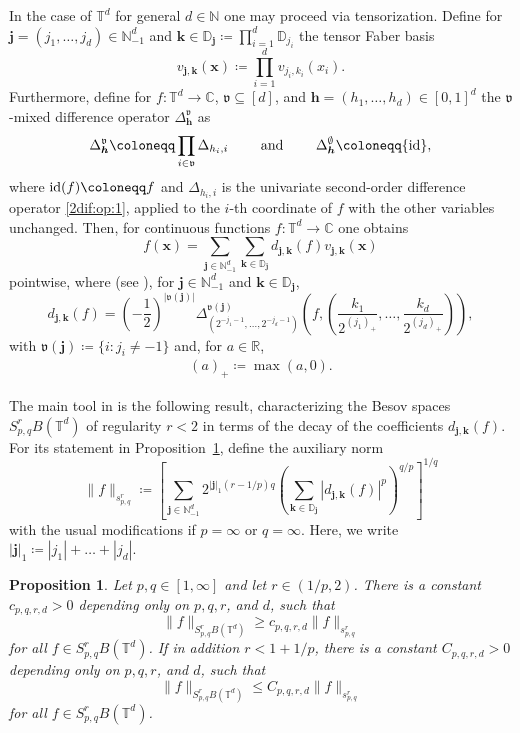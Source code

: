 \documentclass[12pt, a4paper]{article}
\newtheorem{prop}[thm]{Proposition}
\newcommand{\vv}{\mathfrak{v}}
\newcommand{\bsx}{{\boldsymbol{x}}}
\newcommand{\bsj}{{\boldsymbol{j}}}
\newcommand{\bsk}{{\boldsymbol{k}}}
\newcommand{\bsh}{{\boldsymbol{h}}}
\newcommand{\bbR}{{\mathbb{R}}}
\newcommand{\bbT}{{\mathbb{T}}}
\newcommand{\bbN}{{\mathbb{N}}}
\newcommand{\bbD}{{\mathbb{D}}}
\newcommand{\bbC}{{\mathbb{C}}}
\begin{document}
In the case of $\bbT^d$ for general $d \in \bbN$ one may proceed via tensorization. Define for $\bsj =(j_1,\ldots,j_d) \in \bbN_{-1}^d$ and
$\bsk \in \bbD_{\bsj} \coloneqq \prod_{i=1}^d \bbD_{j_i}$ the tensor Faber basis
$$
v_{\bsj, \bsk}(\bsx) \coloneqq \prod_{i=1}^d v_{j_i, k_i}(x_i).
$$
Furthermore, define for $f:\bbT^d \rightarrow \bbC$, $\vv \subseteq [d]$, and $\bsh=(h_1,\ldots,h_d) \in [0,1]^d$ the $\vv$-mixed difference operator $\Delta_{\bsh}^{\vv}$ as $$\Delta_{\bsh}^{\vv}\coloneqq \prod_{i \in \vv} \Delta_{h_i,i} \qquad \mbox{ and } \qquad \Delta_{\bsh}^{\emptyset}\coloneqq {\rm id},$$ where ${\rm id}(f)\coloneqq f$ and $\Delta_{h_i,i}$ is the univariate second-order difference operator \eqref{2dif:op:1}, applied to the $i$-th coordinate of $f$ with the other variables unchanged. Then, for continuous functions $f:\bbT^d \rightarrow \bbC$ one obtains
$$
f(\bsx) = \sum_{\bsj \in \bbN_{-1}^d} \sum_{\bsk \in \bbD_\bsj} d_{\bsj, \bsk}(f) v_{\bsj, \bsk}(\bsx)
$$
pointwise, where (see \cite[Equation~(3.6)]{HMOU}), for $\bsj \in \bbN_{-1}^d$ and $\bsk \in \bbD_\bsj$, $$d_{\bsj, \bsk}(f) = \left(-\frac{1}{2}\right)^{|\vv(\bsj)|} \Delta^{\vv(\bsj)}_{(2^{-j_1-1},\ldots,2^{-j_d-1})}\left(f,\left(\frac{k_1}{2^{(j_1)_+}},\ldots,\frac{k_d}{2^{(j_d)_+}} \right)\right),$$ with $\vv(\bsj)\coloneqq\{i : j_i \not=-1\}$ and, for $a \in \bbR$,
\begin{align} \label{pos_part}
    (a)_+\coloneqq\max(a,0).
\end{align}

The main tool in \cite{HMOU} is the following result, characterizing the Besov spaces $S_{p, q}^rB(\mathbb T^d)$ of regularity $r<2$ in terms of the decay of the coefficients $d_{\bsj, \bsk}(f)$. For its statement in Proposition~\ref{prop:Besov_norm}, define the auxiliary norm
$$
\|f\|_{s_{p, q}^r} \coloneqq \left[\sum_{\bsj \in \bbN_{-1}^d} 2^{|\bsj|_1 (r-1/p) q} \left(\sum_{\bsk \in \bbD_\bsj} |d_{\bsj, \bsk}(f)|^p\right)^{q/p}\right]^{1/q}
$$
with the usual modifications if $p = \infty$ or $q = \infty$. Here, we write $|\bsj|_1 \coloneqq |j_1| + \dots + |j_d|$.

\begin{prop}\label{prop:Besov_norm}
Let $p,q \in [1,\infty]$ and let $r \in (1/p,2)$. There is a constant $c_{p, q, r, d} > 0$ depending only on $p, q, r$, and $d$, such that
$$
\|f\|_{S_{p, q}^rB(\bbT^d)} \geq c_{p, q, r, d} \|f\|_{s_{p, q}^r}
$$
for all $f \in S_{p, q}^rB(\bbT^d)$. If in addition $r < 1+1/p$, there is a constant $C_{p, q, r, d} > 0$ depending only on $p, q, r$, and $d$, such that
$$
\|f\|_{S_{p, q}^rB(\bbT^d)} \leq C_{p, q, r, d} \|f\|_{s_{p, q}^r}
$$
for all $f \in S_{p, q}^rB(\bbT^d)$.
\end{prop}
\end{document}
